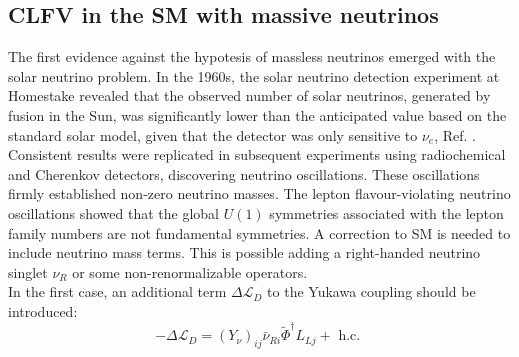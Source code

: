 \subsection{CLFV in the SM with massive neutrinos}\label{massiveneutrinos}
The first evidence against the hypotesis of massless neutrinos emerged with the solar neutrino problem. In the 1960s, the solar neutrino detection experiment at Homestake revealed that the observed number of solar neutrinos, generated by fusion in the Sun, was significantly lower than the anticipated value based on the standard solar model, given that the detector was only sensitive to $\nu_e$, Ref. \cite{PhysRevLett.20.1205}. Consistent results were replicated in subsequent experiments using radiochemical and Cherenkov detectors, discovering neutrino oscillations. These oscillations firmly established non-zero neutrino masses. The lepton flavour-violating neutrino oscillations showed that the global $U(1)$ symmetries associated with the lepton family numbers are not fundamental symmetries. A correction to SM is needed to include neutrino mass terms. This is possible adding a right-handed neutrino singlet $\nu_R$ or some non-renormalizable operators.
\\
In the first case, an additional term $\Delta \mathscr{L}_D$ to the Yukawa coupling should be introduced:
\begin{equation}
-\Delta \mathscr{L}_D=\left(Y_\nu\right)_{i j} \bar{\nu}_{R i}  \widetilde{\Phi}^\dagger L_{Lj}+\text { h.c. }
\end{equation}


